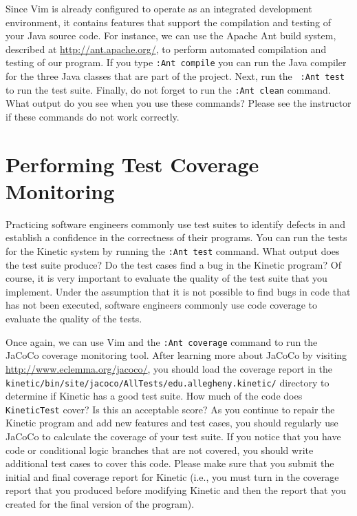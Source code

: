 Since Vim is already configured to operate as an integrated development environment, it contains features that support
the compilation and testing of your Java source code.  For instance, we can use the Apache Ant build system, described
at \url{http://ant.apache.org/}, to perform automated compilation and testing of our program. If you type {\tt :Ant
	compile} you can run the Java compiler for the three Java classes that are part of the project.  Next, run the {\tt
:Ant test} to run the test suite.  Finally, do not forget to run the {\tt :Ant clean} command. What output do you see
when you use these commands? Please see the instructor if these commands do not work correctly.

\section*{Performing Test Coverage Monitoring}

Practicing software engineers commonly use test suites to identify defects in and establish a confidence in the
correctness of their programs.  You can run the tests for the Kinetic system by running the {\tt :Ant test} command.
What output does the test suite produce?  Do the test cases find a bug in the Kinetic program?  Of course, it is very
important to evaluate the quality of the test suite that you implement.  Under the assumption that it is not possible to
find bugs in code that has not been executed, software engineers commonly use code coverage to evaluate the quality of
the tests.  

Once again, we can use Vim and the {\tt :Ant coverage} command to run the JaCoCo coverage monitoring tool.  After
learning more about JaCoCo by visiting \url{http://www.eclemma.org/jacoco/}, you should load the coverage report in the
{\tt kinetic/bin/site/jacoco/AllTests/edu.allegheny.kinetic/} directory to determine if Kinetic has a good test suite.
How much of the code does {\tt KineticTest} cover?  Is this an acceptable score?  As you continue to repair the Kinetic
program and add new features and test cases, you should regularly use JaCoCo to calculate the coverage of your test
suite.  If you notice that you have code or conditional logic branches that are not covered, you should write additional
test cases to cover this code.  Please make sure that you submit the initial and final coverage report for Kinetic
(i.e., you must turn in the coverage report that you produced before modifying Kinetic and then the report that you
created for the final version of the program).

